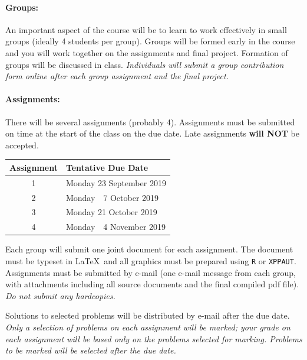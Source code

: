 \documentclass[12pt]{article}
\newcommand{\note}{\noindent{\bfseries\slshape Note:\/} }
\begin{document}
\paragraph*{Groups:} An important aspect of the course will be to learn to work effectively in small groups (ideally 4 students per group).  Groups will be formed early in the course and you will work together on the assignments and final project.  Formation of groups will be discussed in class.  \emph{Individuals will submit a group contribution form online after each group assignment and the final project.}

\paragraph*{Assignments:} There will be several assignments (probably 4).  Assignments must be submitted on time at the start of the class on the due date.  Late assignments {\bf will NOT} be accepted.
%
\begin{center}
\begin{tabular}{c|l}
\bf Assignment & \bf Tentative Due Date \\\hline
1 & Monday 23 September 2019 \\
2 & Monday ~\,7 October 2019 \\
3 & Monday 21 October 2019 \\
4 & Monday ~\,4 November 2019 \\
\end{tabular}
\end{center}
%
\noindent
Each group will submit one joint document for each assignment.  The
document must be typeset in \LaTeX\ and all graphics must be prepared
using {\tt R} or {\tt XPPAUT}.  Assignments must be submitted by
e-mail (one e-mail message from each group, with attachments including
all source documents and the final compiled pdf file).  \emph{Do not
  submit any hardcopies.}

Solutions to selected problems will be distributed by e-mail after the due date.
\note \emph{Only a selection of problems on each assignment will be marked; your grade on each assignment will be based only on the problems selected for marking.  Problems to be marked will be selected after the due date.}

\end{document}
